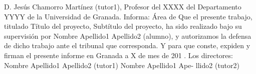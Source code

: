D. Jesús Chamorro Martínez (tutor1), Profesor del
XXXX del Departamento YYYY de la Universidad de Granada.
Informa:  
Área de  
Que el presente trabajo, titulado Título del proyecto, Subtítulo del proyecto, ha sido realizado bajo su supervisión por Nombre Apellido1 Apellido2 (alumno), y autorizamos la defensa de dicho trabajo ante el  tribunal que corresponda.
Y para que conste, expiden y firman el presente informe en Granada a
X de mes de 201 .
Los directores:
Nombre Apellido1 Apellido2 (tutor1) Nombre Apellido1 Ape-
llido2 (tutor2)